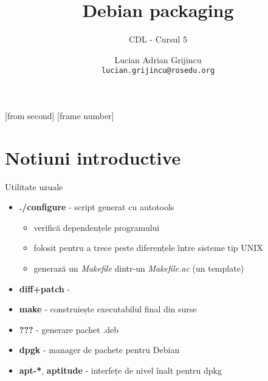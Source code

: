 \documentclass{beamer}
\title[Debian packaging]{Debian packaging}
\subtitle{CDL - Cursul 5}
\institute{ROSEdu}
\author{Lucian Adrian Grijincu \\ \texttt{lucian.grijincu@rosedu.org}}
\begin{document}
[from second]
[frame number]

\frame{\titlepage}

\frame{\tableofcontents}

\section{Notiuni introductive}

\frame{\tableofcontents[currentsection]}

\begin{frame}{Utilitate uzuale}
  \begin{itemize}[<+->]
  \item \textbf{./configure} - script generat cu autotools
    \begin{itemize}
    \item verifică dependențele programului
    \item folosit pentru a trece peste diferențele între sisteme tip UNIX
    \item generază un \textit{Makefile} dintr-un \textit{Makefile.ac} (un template)
    \end{itemize}
  \item \textbf{diff+patch} - 
  \item \textbf{make} - construiește executabilul final din surse
  \item \textbf{???} - generare pachet .deb
  \item \textbf{dpgk} - manager de pachete pentru Debian
  \item \textbf{apt-*}, \textbf{aptitude} - interfețe de nivel înalt pentru dpkg
  \end{itemize}
\end{frame}
\end{document}
